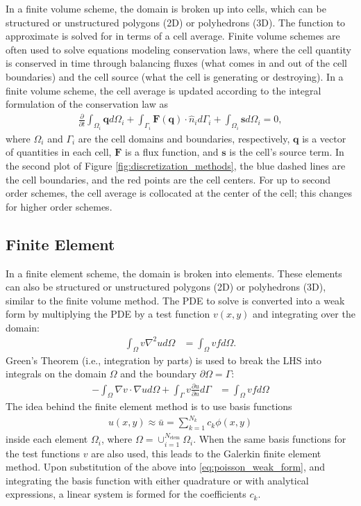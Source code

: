 In a finite volume scheme, the domain is broken up into cells, which can be structured or unstructured polygons (2D) or polyhedrons (3D). The function to approximate is solved for in terms of a cell average. Finite volume schemes are often used to solve equations modeling conservation laws, where the cell quantity is conserved in time through balancing fluxes (what comes in and out of the cell boundaries) and the cell source (what the cell is generating or destroying). In a finite volume scheme, the cell average is updated according to the integral formulation of the conservation law as
\begin{align}
    \frac{\partial}{\partial t} \int_{\Omega_i} \textbf{q} d\Omega_i + \int_{\Gamma_i} \textbf{F}(\textbf{q}) \cdot \hat{n}_i d\Gamma_i + \int_{\Omega_i} \textbf{s} d\Omega_i = 0,
\end{align}
where $\Omega_i$ and $\Gamma_i$ are the cell domains and boundaries, respectively, $\textbf{q}$ is a vector of quantities in each cell, $\textbf{F}$ is a flux function, and $\textbf{s}$ is the cell's source term. In the second plot of Figure \ref{fig:discretization_methods}, the blue dashed lines are the cell boundaries, and the red points are the cell centers. For up to second order schemes, the cell average is collocated at the center of the cell; this changes for higher order schemes.

\subsection{Finite Element}

In a finite element scheme, the domain is broken into elements. These elements can also be structured or unstructured polygons (2D) or polyhedrons (3D), similar to the finite volume method. The PDE to solve is converted into a weak form by multiplying the PDE by a test function $v(x,y)$ and integrating over the domain:
\begin{align}
    \int_{\Omega} v \nabla^2 u d\Omega &= \int_{\Omega} vf d\Omega.
\end{align}
Green's Theorem (i.e., integration by parts) is used to break the LHS into integrals on the domain $\Omega$ and the boundary $\partial \Omega = \Gamma$:
\begin{align}
    -\int_{\Omega} \nabla v \cdot \nabla u d\Omega + \int_{\Gamma} v \frac{\partial u}{\partial n} d\Gamma &= \int_{\Omega} vf d\Omega
    \label{eq:poisson_weak_form}
\end{align}
The idea behind the finite element method is to use basis functions
\begin{align}
    u(x,y) \approx \bar{u} = \sum_{k=1}^{N_k} c_k \phi(x,y)
\end{align}
inside each element $\Omega_i$, where $\Omega = \cup_{i = 1}^{N_{\text{elem}}} \Omega_i$. When the same basis functions for the test functions $v$ are also used, this leads to the Galerkin finite element method. Upon substitution of the above into \ref{eq:poisson_weak_form}, and integrating the basis function with either quadrature or with analytical expressions, a linear system is formed for the coefficients $c_k$.

